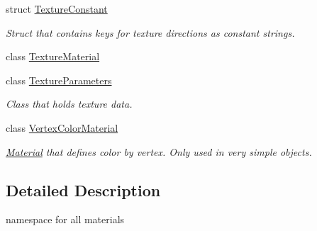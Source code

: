 \begin{DoxyCompactItemize}
struct \mbox{\hyperlink{struct_geometry_engine_1_1_geometry_material_1_1_texture_constant}{Texture\+Constant}}
\begin{DoxyCompactList}\small\item\em Struct that contains keys for texture directions as constant strings. \end{DoxyCompactList}\item 
class \mbox{\hyperlink{class_geometry_engine_1_1_geometry_material_1_1_texture_material}{Texture\+Material}}
\item 
class \mbox{\hyperlink{class_geometry_engine_1_1_geometry_material_1_1_texture_parameters}{Texture\+Parameters}}
\begin{DoxyCompactList}\small\item\em Class that holds texture data. \end{DoxyCompactList}\item 
class \mbox{\hyperlink{class_geometry_engine_1_1_geometry_material_1_1_vertex_color_material}{Vertex\+Color\+Material}}
\begin{DoxyCompactList}\small\item\em \mbox{\hyperlink{class_geometry_engine_1_1_geometry_material_1_1_material}{Material}} that defines color by vertex. Only used in very simple objects. \end{DoxyCompactList}\end{DoxyCompactItemize}


\subsection{Detailed Description}
namespace for all materials 